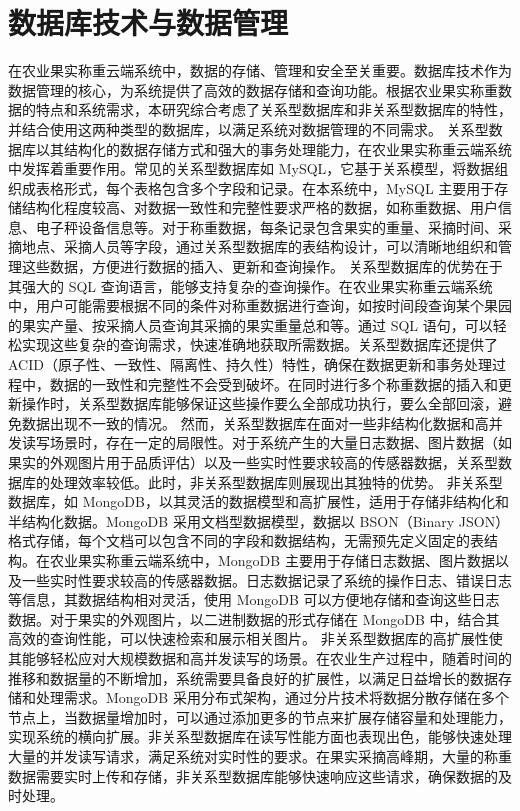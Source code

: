 \documentclass{xduugthesis}
\begin{document}
\section{数据库技术与数据管理}
在农业果实称重云端系统中，数据的存储、管理和安全至关重要。数据库技术作为数据管理的核心，为系统提供了高效的数据存储和查询功能。根据农业果实称重数据的特点和系统需求，本研究综合考虑了关系型数据库和非关系型数据库的特性，并结合使用这两种类型的数据库，以满足系统对数据管理的不同需求。
关系型数据库以其结构化的数据存储方式和强大的事务处理能力，在农业果实称重云端系统中发挥着重要作用。常见的关系型数据库如 MySQL，它基于关系模型，将数据组织成表格形式，每个表格包含多个字段和记录。在本系统中，MySQL 主要用于存储结构化程度较高、对数据一致性和完整性要求严格的数据，如称重数据、用户信息、电子秤设备信息等。对于称重数据，每条记录包含果实的重量、采摘时间、采摘地点、采摘人员等字段，通过关系型数据库的表结构设计，可以清晰地组织和管理这些数据，方便进行数据的插入、更新和查询操作。
关系型数据库的优势在于其强大的 SQL 查询语言，能够支持复杂的查询操作。在农业果实称重云端系统中，用户可能需要根据不同的条件对称重数据进行查询，如按时间段查询某个果园的果实产量、按采摘人员查询其采摘的果实重量总和等。通过 SQL 语句，可以轻松实现这些复杂的查询需求，快速准确地获取所需数据。关系型数据库还提供了 ACID（原子性、一致性、隔离性、持久性）特性，确保在数据更新和事务处理过程中，数据的一致性和完整性不会受到破坏。在同时进行多个称重数据的插入和更新操作时，关系型数据库能够保证这些操作要么全部成功执行，要么全部回滚，避免数据出现不一致的情况。
然而，关系型数据库在面对一些非结构化数据和高并发读写场景时，存在一定的局限性。对于系统产生的大量日志数据、图片数据（如果实的外观图片用于品质评估）以及一些实时性要求较高的传感器数据，关系型数据库的处理效率较低。此时，非关系型数据库则展现出其独特的优势。
非关系型数据库，如 MongoDB，以其灵活的数据模型和高扩展性，适用于存储非结构化和半结构化数据。MongoDB 采用文档型数据模型，数据以 BSON（Binary JSON）格式存储，每个文档可以包含不同的字段和数据结构，无需预先定义固定的表结构。在农业果实称重云端系统中，MongoDB 主要用于存储日志数据、图片数据以及一些实时性要求较高的传感器数据。日志数据记录了系统的操作日志、错误日志等信息，其数据结构相对灵活，使用 MongoDB 可以方便地存储和查询这些日志数据。对于果实的外观图片，以二进制数据的形式存储在 MongoDB 中，结合其高效的查询性能，可以快速检索和展示相关图片。
非关系型数据库的高扩展性使其能够轻松应对大规模数据和高并发读写的场景。在农业生产过程中，随着时间的推移和数据量的不断增加，系统需要具备良好的扩展性，以满足日益增长的数据存储和处理需求。MongoDB 采用分布式架构，通过分片技术将数据分散存储在多个节点上，当数据量增加时，可以通过添加更多的节点来扩展存储容量和处理能力，实现系统的横向扩展。非关系型数据库在读写性能方面也表现出色，能够快速处理大量的并发读写请求，满足系统对实时性的要求。在果实采摘高峰期，大量的称重数据需要实时上传和存储，非关系型数据库能够快速响应这些请求，确保数据的及时处理。
\end{document}
